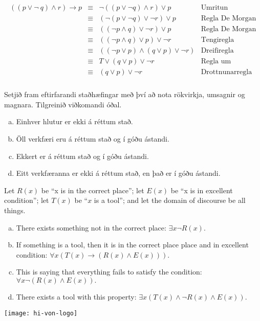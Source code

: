 \documentclass{exam}
\begin{document}
\begin{questions}
\begin{solution}
\begin{eqnarray*}
\begin{array}{llll}
	(( p \lor \lnot ~q) \land r) \rightarrow p
& \equiv & \lnot((p \lor \lnot q)\land r) \lor p &\textrm{Umritun leiðingar} \\
& \equiv & ( \lnot (p \lor \lnot q) \lor \lnot r) \lor p &\textrm{Regla De Morgan}\\
& \equiv & (( \lnot p \land q) \lor \lnot r) \lor p &	\textrm{Regla De Morgan}\\
& \equiv & (( \lnot p \land q) \lor p) \lor \lnot r &	\textrm{Tengiregla}\\
& \equiv & ((\lnot p \lor p) \land (q \lor p) \lor \lnot r)	&\textrm{Dreifiregla}\\
& \equiv & T \lor (q \lor p) \lor \lnot r	&\textrm{Regla um eiginleika neitunar}\\
& \equiv & (q \lor p) \lor \lnot r	&\textrm{Drottnunarregla}\\
\end{array}
\end{eqnarray*}
\end{solution}


\question Setjið fram eftirfarandi staðhæfingar með því að nota rökvirkja, umsagnir og magnara. Tilgreinið viðkomandi óðal.
\begin{enumerate}[a)]
 \item Einhver hlutur er ekki á réttum stað.
 \item Öll verkfæri eru á réttum stað og í góðu ástandi.
 \item Ekkert er á réttum stað og í góðu ástandi.
 \item Eitt verkfæranna er ekki á réttum stað, en það er í góðu ástandi.
\end{enumerate}

\begin{solution}

Let $R(x)$ be ``x is in the correct place''; let $E(x)$ be ``x is in excellent condition''; let $T(x)$ be ``$x$ is a tool''; and let the domain of discourse be all things.

\begin{enumerate}[a)]
\item There exists something not in the correct place: $\exists x \lnot R(x)$.
\item If something is a tool, then it is in the correct place place and in excellent condition: $\forall x (T(x) \to (R(x) \land E(x))).$
\item This is saying that everything fails to satisfy the condition: $\forall x \lnot (R(x) \land E(x)).$
\item There exists a tool with this property: $\exists x (T(x) \land  \lnot R(x) \land E(x)).$
\end{enumerate}
\end{solution}



\end{questions}

\vfill
\texttt{[image: hi-von-logo]}
\end{document}
